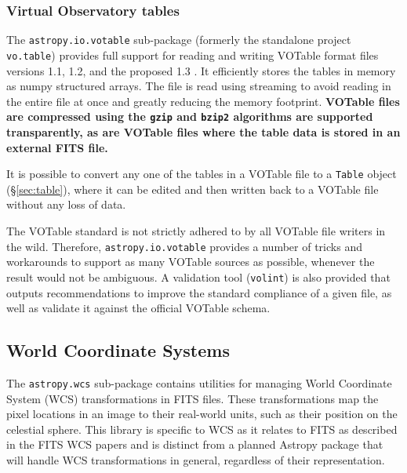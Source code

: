 \documentclass[traditabstract]{aa}
\begin{document}
\subsubsection{Virtual Observatory tables}

\label{sec:votable}


The \texttt{astropy.io.votable} sub-package (formerly the standalone
project \texttt{vo.table}) provides full support for reading and
writing VOTable format files versions 1.1, 1.2, and the proposed 1.3
\citep{ochsenbein2004votable,ochsenbein2009votable}. It efficiently
stores the tables in memory as \gls{numpy} structured arrays. The file
is read using streaming to avoid reading in the entire file at once
and greatly reducing the memory footprint.  \textbf{VOTable files are
compressed using the \texttt{gzip} and \texttt{bzip2} algorithms are
supported transparently, as are VOTable files
where the table data is stored in an external FITS file.}

It is possible to convert any one of the tables in a VOTable file to a
\texttt{Table} object (\S\ref{sec:table}), where it can be edited and then
written back to a VOTable file without any loss of data.

The VOTable standard is not strictly adhered to by all VOTable file writers in
the wild. Therefore, \texttt{astropy.io.votable} provides a number of tricks
and workarounds to support as many VOTable sources as possible, whenever the
result would not be ambiguous. A validation tool (\texttt{volint}) is also
provided that outputs recommendations to improve the standard compliance of a
given file, as well as validate it against the official VOTable schema.

\subsection{World Coordinate Systems}

\label{sec:wcs}


The \texttt{astropy.wcs} sub-package contains utilities for managing World
Coordinate System (WCS) transformations in FITS files. These transformations
map the pixel locations in an image to their real-world units, such as their
position on the celestial sphere. This library is specific to WCS as it relates
to FITS as described in the FITS WCS papers
\citep{greisen2002wcs,calabretta2002wcs,greisen2006wcs} and is distinct from a
planned Astropy package that will handle WCS transformations in general,
regardless of their representation.
\end{document}
